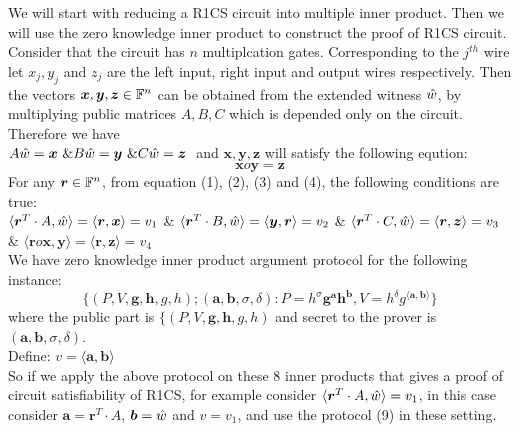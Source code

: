 We will start with reducing a R1CS circuit into multiple inner product. Then we will use the zero knowledge inner product to construct the proof of R1CS circuit. Consider that the circuit has $n$ multiplcation gates. Corresponding to the $j^{th}$ wire let $x_j, y_j$ and $z_j$ are the left input, right input and output wires respectively. Then the vectors $\bm{x}, \bm{y}, \bm{z}\in \mathbb{F}^n$ can be obtained from the extended witness $\hat{w}$, by multiplying public matrices $A, B, C$ which is depended only on the circuit. Therefore we have \\
$A \hat{w} = \bm{x} \text{ }\&
B \hat{w} = \bm{y} \text{ }\&
C \hat{w} = \bm{z} \text{ }$
and $\bm{x}, \bm{y}, \bm{z}$ will satisfy the following eqution:
\begin{equation}
	\bm{x} o \bm{y} =\bm{z}
\end{equation}
For any $\bm{r}\in \mathbb{F}^n$, from equation (1), (2), (3) and (4), the following conditions are true:\\
$\langle \bm{r}^T \cdot A, \hat{w} \rangle = \langle \bm{r}, \bm{x} \rangle = v_1$ \&
$\langle \bm{r}^T \cdot B, \hat{w} \rangle = \langle \bm{y}, \bm{r} \rangle = v_2$ \&
$\langle \bm{r}^T \cdot C, \hat{w} \rangle = \langle \bm{r}, \bm{z} \rangle = v_3$ \&
$\langle \bm{r} o \bm{x}, \bm{y} \rangle = \langle \bm{r}, \bm{z} \rangle = v_4 $ \\
We have zero knowledge inner product argument protocol for the following instance:
\begin{equation} 
\{(P,V,\bm{g},\bm{h},g,h);(\bm{a},\bm{b},\sigma,\delta): P=h^{\sigma}\bm{g}^{\bm{a}}\bm{h}^{\bm{b}}, V=h^{\delta}g^{\langle \bm{a},\bm{b}\rangle}\} 
\end{equation}
where the public part is $\{(P,V,\bm{g},\bm{h},g,h)$ and secret to the prover is $(\bm{a},\bm{b},\sigma,\delta)$.\\
Define: $v=\langle \bm{a},\bm{b}\rangle$\\
So if we apply the above protocol on these 8 inner products that gives a proof of circuit satisfiability of R1CS, for example consider $\langle \bm{r}^T \cdot A, \hat{w} \rangle = v_1$, in this case consider $\bm{a}=\bm{r}^T\cdot A$, $\bm{b}=\hat{w}$ and $v=v_1$, and use the protocol (9) in these setting.
